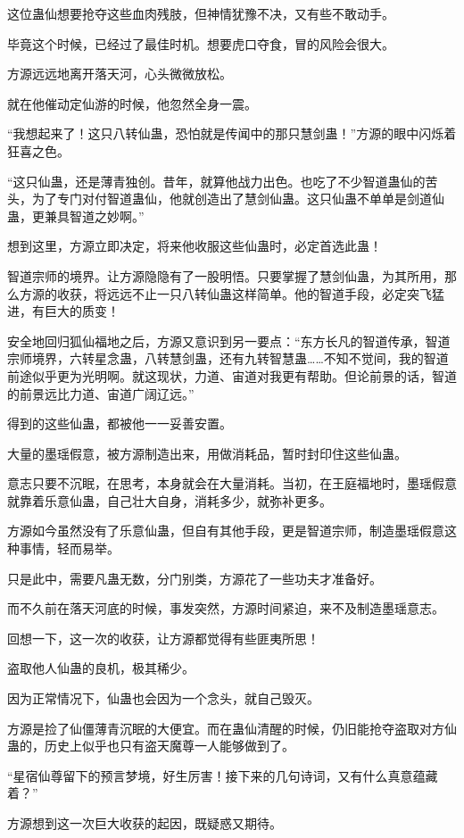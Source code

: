 \begin{this_body}
这位蛊仙想要抢夺这些血肉残肢，但神情犹豫不决，又有些不敢动手。

毕竟这个时候，已经过了最佳时机。想要虎口夺食，冒的风险会很大。

方源远远地离开落天河，心头微微放松。

就在他催动定仙游的时候，他忽然全身一震。

“我想起来了！这只八转仙蛊，恐怕就是传闻中的那只慧剑蛊！”方源的眼中闪烁着狂喜之色。

“这只仙蛊，还是薄青独创。昔年，就算他战力出色。也吃了不少智道蛊仙的苦头，为了专门对付智道蛊仙，他就创造出了慧剑仙蛊。这只仙蛊不单单是剑道仙蛊，更兼具智道之妙啊。”

想到这里，方源立即决定，将来他收服这些仙蛊时，必定首选此蛊！

智道宗师的境界。让方源隐隐有了一股明悟。只要掌握了慧剑仙蛊，为其所用，那么方源的收获，将远远不止一只八转仙蛊这样简单。他的智道手段，必定突飞猛进，有巨大的质变！

安全地回归狐仙福地之后，方源又意识到另一要点：“东方长凡的智道传承，智道宗师境界，六转星念蛊，八转慧剑蛊，还有九转智慧蛊……不知不觉间，我的智道前途似乎更为光明啊。就这现状，力道、宙道对我更有帮助。但论前景的话，智道的前景远比力道、宙道广阔辽远。”

得到的这些仙蛊，都被他一一妥善安置。

大量的墨瑶假意，被方源制造出来，用做消耗品，暂时封印住这些仙蛊。

意志只要不沉眠，在思考，本身就会在大量消耗。当初，在王庭福地时，墨瑶假意就靠着乐意仙蛊，自己壮大自身，消耗多少，就弥补更多。

方源如今虽然没有了乐意仙蛊，但自有其他手段，更是智道宗师，制造墨瑶假意这种事情，轻而易举。

只是此中，需要凡蛊无数，分门别类，方源花了一些功夫才准备好。

而不久前在落天河底的时候，事发突然，方源时间紧迫，来不及制造墨瑶意志。

回想一下，这一次的收获，让方源都觉得有些匪夷所思！

盗取他人仙蛊的良机，极其稀少。

因为正常情况下，仙蛊也会因为一个念头，就自己毁灭。

方源是捡了仙僵薄青沉眠的大便宜。而在蛊仙清醒的时候，仍旧能抢夺盗取对方仙蛊的，历史上似乎也只有盗天魔尊一人能够做到了。

“星宿仙尊留下的预言梦境，好生厉害！接下来的几句诗词，又有什么真意蕴藏着？”

方源想到这一次巨大收获的起因，既疑惑又期待。


\end{this_body}
